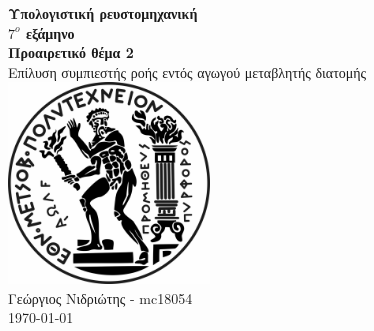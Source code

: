 \begin{center}
    \vspace{4cm}
    \huge
    \textbf{Υπολογιστική ρευστομηχανική}\\
    \textbf{ {$7^o$} εξάμηνο} \\
    \vspace{1cm}
    \LARGE
    \textbf{Προαιρετικό θέμα 2}\\
    \vspace{0.5cm}
    \LARGE
    Επίλυση συμπιεστής ροής εντός αγωγού μεταβλητής διατομής\vfill
    \includegraphics[width=0.4\textwidth]{pyrforos_bw.jpg}\\
    \vspace{4cm}
    \Large
    Γεώργιος Νιδριώτης  - mc18054\\

    \today
    \vspace{2cm}
\end{center}

